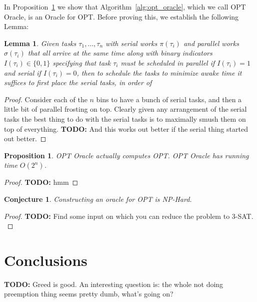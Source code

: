 \documentclass[twocolumn]{article}[10pt]
\newcommand{\todo}[1]{{\color{red}\textbf{TODO:} #1}}
\newtheorem{proposition}{Proposition}
\newtheorem{conjecture}{Conjecture}
\newtheorem{lemma}{Lemma}
\begin{document}
In Proposition~\ref{prop:opt_oracle} we show that
Algorithm~\ref{alg:opt_oracle}, which we call OPT Oracle, is an
Oracle for OPT.
Before proving this, we establish the following Lemma:
\begin{lemma} %
  \label{lem:one_time_scheduling}
  Given tasks $\tau_1, \ldots, \tau_n$ with serial works
  $\pi(\tau_i)$ and parallel works $\sigma(\tau_i)$ that all
  arrive at the same time along with binary indicators $I(\tau_i)\in
  \{0, 1\}$ specifying that task $\tau_i$ must be scheduled in
  parallel if $I(\tau_i) = 1$ and serial if $I(\tau_i) = 0$, then
  to schedule the tasks to minimize awake time it suffices to
  first place the serial tasks, in order of 
\end{lemma}
\begin{proof}
  Consider each of the $n$ bins to have a bunch of serial tasks,
  and then a little bit of parallel frosting on top. Clearly
  given any arrangement of the serial tasks the best thing to do
  with the serial tasks is to maximally smush them on top of
  everything. \todo{And this works out better if the serial thing
  started out better.}
\end{proof}

\begin{proposition}
  \label{prop:opt_oracle}
  OPT Oracle actually computes OPT. OPT Oracle has running time
  $O(2^n)$.
\end{proposition}
\begin{proof}
  \todo{hmm}
\end{proof}

\begin{conjecture}
  Constructing an oracle for OPT is NP-Hard.
\end{conjecture}
\begin{proof}
  \todo{
    Find some input on which you can reduce the problem to $3$-SAT.
  }
\end{proof}


\section{Conclusions}
\todo{
Greed is good. 
An interesting question is: the whole not doing preemption thing
seems pretty dumb, what's going on?
}



\end{document}
